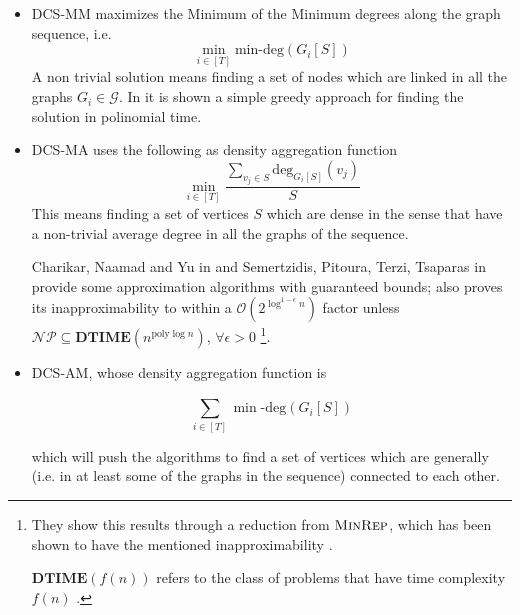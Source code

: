\begin{itemize}
	\item \acrshort{DCS}-MM maximizes the Minimum of the Minimum degrees along
	      the graph sequence, i.e.
	      \begin{equation}
		      \label{eq:dcs-mm}
		      \min_{i \in [T]} \text{min-deg} (G_i[S])
	      \end{equation}
	      A non trivial solution means finding a set of nodes which are linked
	      in all the graphs $G_i \in \mathcal{G} $.
	      In \cite{semertzidis2019finding} it is shown a simple greedy approach
	      for finding the solution in polinomial time.
	\item \acrshort{DCS}-MA uses the following as density aggregation function
	      \begin{equation}
		      \label{eq:dcs-ma}
		      \min_{i \in [T]}
		      \frac{\sum^{}_{v_{j} \in S } \text{deg}_{G_i[S]} (v_{j} )}{S}
	      \end{equation}
	      This means finding a set of vertices $S$ which are dense in the sense
	      that have a non-trivial average degree in all the graphs of the
	      sequence.


	      Charikar, Naamad and Yu in \cite{charikar2018finding} and
	      Semertzidis, Pitoura, Terzi, Tsaparas in
	      \cite{semertzidis2019finding} provide some
	      approximation algorithms with guaranteed bounds;
	      \cite{charikar2018finding} also proves its
	      inapproximability to within a $\mathcal{O}(2 ^{\log^{1-\epsilon} n} )
	      $ factor unless $\mathcal{NP} \subseteq \mathbf{DTIME} (n
		      ^{\text{poly}\log n} ) $, $\forall \epsilon > 0$
	      \footnote{They show this results through a reduction from
	      $\textsc{MinRep}$, which has been shown to have the mentioned
	      inapproximability \cite{charikar2018finding}\cite{kortsarz2001hardness}.

	      $ \mathbf{DTIME}(f(n)) $ refers to the class of problems that
	      have time complexity $f(n)$ \cite{9780521884730}.
	      }.
	\item \acrshort{DCS}-AM, whose density aggregation function is

	      \begin{equation}
		      \label{eq:dcs-am}
		      \sum^{}_{i \in [T]} \min\text{-deg} (G_i [S])
	      \end{equation}

	      which will push the algorithms to find a set of vertices which are
	      generally (i.e. in at least some of the graphs in the sequence)
	      connected to each other.


\end{itemize}
